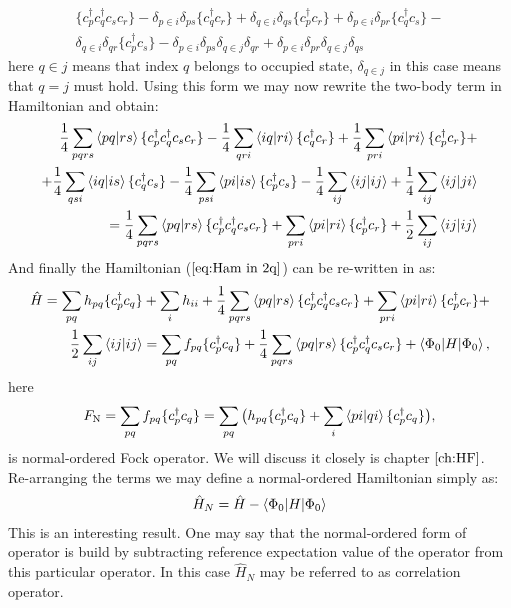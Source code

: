 \documentclass[twoside,english]{uiofysmaster}
\theoremstyle{definition}
\begin{document}
\begin{eqnarray}
 \{ c_p^\dagger c_q^\dagger c_s c_r  \} -\delta_{p \in i} \delta_{ps} \{  c_q^\dagger  c_r  \} +\delta_{q \in i} \delta_{qs}  \{  c_p^\dagger  c_r  \} + \delta_{p \in i} \delta_{pr} \{  c_q^\dagger  c_s  \}-\nonumber\\ \delta_{q \in i} \delta_{qr} \{  c_p^\dagger  c_s  \}-  \delta_{p \in i} \delta_{ps} \delta_{q \in j} \delta_{qr}+ \delta_{p \in i} \delta_{pr} \delta_{q \in j} \delta_{qs}
\end{eqnarray}
here $q \in j$ means that index $q$ belongs to occupied state,  $\delta_{q \in j}$ in this case means that $q=j$ must hold. Using this form we may now rewrite the two-body term in Hamiltonian and obtain:
\begin{eqnarray}
\frac{1}{4}\sum_{pqrs}\braket{pq|rs}\{ c_p^\dagger c_q^\dagger c_s c_r  \}-\frac{1}{4}\sum_{qri}\braket{iq|ri}\{ c_q^\dagger  c_r  \} +\frac{1}{4}\sum_{pri}\braket{pi|ri}\{ c_p^\dagger  c_r  \} + \nonumber\\ 
+\frac{1}{4}\sum_{qsi}\braket{iq|is}\{ c_q^\dagger  c_s  \} -\frac{1}{4}\sum_{psi}\braket{pi|is}\{ c_p^\dagger  c_s  \} -\frac{1}{4}\sum_{ij}\braket{ij|ij} + \frac{1}{4}\sum_{ij}\braket{ij|ji}  \nonumber\\ 
=\frac{1}{4}\sum_{pqrs}\braket{pq|rs}\{ c_p^\dagger c_q^\dagger c_s c_r  \} + \sum_{pri}\braket{pi|ri}\{ c_p^\dagger  c_r  \} + \frac{1}{2} \sum_{ij}\braket{ij|ij} 
\end{eqnarray}
And finally the Hamiltonian ($\ref{eq:Ham in 2q}$) can be re-written in as:
\begin{eqnarray}
\hat{H} = \sum_{pq} h_{pq} \{c_p^\dagger c_q \} + \sum_{i}h_{ii} + \frac{1}{4}\sum_{pqrs}\braket{pq|rs}\{ c_p^\dagger c_q^\dagger c_s c_r  \} + \sum_{pri}\braket{pi|ri}\{ c_p^\dagger  c_r  \} + \nonumber\\ \frac{1}{2} \sum_{ij}\braket{ij|ij} 
=  \sum_{pq} f_{pq} \{c_p^\dagger c_q \} + \frac{1}{4}\sum_{pqrs}\braket{pq|rs}\{ c_p^\dagger c_q^\dagger c_s c_r  \} + \braket{\Phi_0|H|\Phi_0},
\end{eqnarray}
here 
\begin{equation}\label{eq:Fock_operator}
F_\text{N} = \sum_{pq}f_{pq}\{c_p^\dagger c_q \}=\sum_{pq}\big(h_{pq}\{c_p^\dagger c_q \}+\sum_{i}\braket{pi|qi}\{c_p^\dagger c_q \}\big),
\end{equation}
 is normal-ordered Fock operator. We will discuss it closely is chapter $\ref{ch:HF}$.\\
Re-arranging the terms we may define a normal-ordered Hamiltonian simply as:
\begin{eqnarray}
\hat{H}_N = \hat{H} - \braket{\Phi_0|H|\Phi_0}
\end{eqnarray}
This is an interesting result. One may say that the normal-ordered form of operator is build by subtracting reference expectation value of the operator from this particular operator. In this case $\hat{H}_N$ may be referred to as correlation operator.
\end{document}
